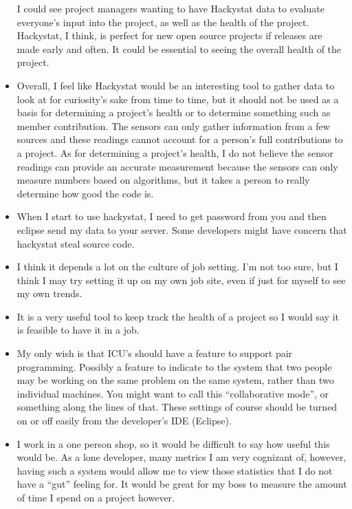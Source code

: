\begin{itemize}
I could see project managers wanting to have Hackystat data to evaluate everyone's input into the project, as well as the health of the project. Hackystat, I think, is perfect for new open source projects if releases are made early and often. It could be essential to seeing the overall health of the project.
\item Overall, I feel like Hackystat would be an interesting tool to gather data to look at for curiosity's sake from time to time, but it should not be used as a basis for determining a project's health or to determine something such as member contribution. The sensors can only gather information from a few sources and these readings cannot account for a person's full contributions to a project. As for determining a project's health, I do not believe the sensor readings can provide an accurate measurement because the sensors can only measure numbers based on algorithms, but it takes a person to really determine how good the code is.
\item When I start to use hackystat, I need to get password from you and then eclipse send my data to your server. Some developers might have concern that hackystat steal source code.
\item I think it depends a lot on the culture of job setting.  I'm not too sure, but I think I may try setting it up on my own job site, even if just for myself to see my own trends.
\item It is a very useful tool to keep track the health of a project so I would say it is feasible to have it in a job.
\item My only wish is that ICU's should have a feature to support pair programming. Possibly a feature to indicate to the system that two people may be working on the same problem on the same system, rather than two individual machines. You might want to call this ``collaborative mode'', or something along the lines of that. These settings of course should be turned on or off easily from the developer's IDE (Eclipse).  
\item I work in a one person shop, so it would be difficult to say how useful this would be.  As a lone developer, many metrics I am very cognizant of, however, having such a system would allow me to view those statistics that I do not have a ``gut'' feeling for.  It would be great for my boss to measure the amount of time I spend on a project however.
\end{itemize}